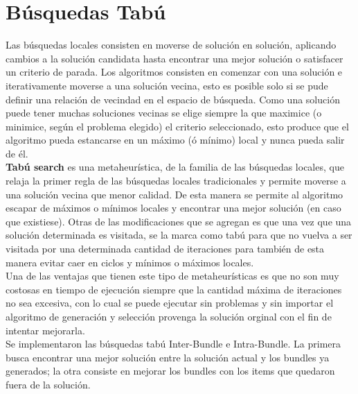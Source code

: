 \section{Búsquedas Tabú}
Las búsquedas locales consisten en moverse de solución en solución, aplicando cambios a la solución candidata hasta encontrar una mejor solución o satisfacer un criterio de parada. Los algoritmos consisten en comenzar con una solución e iterativamente moverse a una solución vecina, esto es posible solo si se pude definir una relación de vecindad en el espacio de búsqueda. Como una solución puede tener muchas soluciones vecinas se elige siempre la que maximice (o minimice, según el problema elegido) el criterio seleccionado, esto produce que el algoritmo pueda estancarse en un máximo (ó mínimo) local y nunca pueda salir de él.\\
\textbf{Tabú search} es una metaheurística, de la familia de las búsquedas locales, que relaja la primer regla de las búsquedas locales tradicionales y permite moverse a una solución vecina que menor calidad. De esta manera se permite al algoritmo escapar de máximos o mínimos locales y encontrar una mejor solución (en caso que existiese). Otras de las modificaciones que se agregan es que una vez que una solución determinada es visitada, se la marca como tabú para que no vuelva a ser visitada por una determinada cantidad de iteraciones para también de esta manera evitar caer en ciclos y mínimos o máximos locales.\\
Una de las ventajas que tienen este tipo de metaheurísticas es que no son muy costosas en tiempo de ejecución siempre que la cantidad máxima de iteraciones no sea excesiva, con lo cual se puede ejecutar sin problemas y sin importar el algoritmo de generación y selección provenga la solución orginal con el fin de intentar mejorarla.\\
Se implementaron las búsquedas tabú Inter-Bundle e Intra-Bundle. La primera busca encontrar una mejor solución entre la solución actual y los bundles ya generados; la otra consiste en mejorar los bundles con los items que quedaron fuera de la solución.

